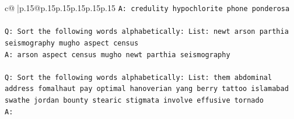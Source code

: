 \documentclass{article}
\begin{document}
{\begin{supertabular}{c@{$\;$}|p{.15\linewidth}@{}p{.15\linewidth}p{.15\linewidth}p{.15\linewidth}p{.15\linewidth}p{.15\linewidth}}
{{{\texttt{A: credulity hypochlorite phone ponderosa} \\
\\ 
\texttt{Q: Sort the following words alphabetically: List: newt arson parthia seismography mugho aspect census} \\
\texttt{A: arson aspect census mugho newt parthia seismography} \\
\\ 
\texttt{Q: Sort the following words alphabetically: List: them abdominal address fomalhaut pay optimal hanoverian yang berry tattoo islamabad swathe jordan bounty stearic stigmata involve effusive tornado} \\
\texttt{A:} \\
            }
        }
    }
     \\ \\


\end{supertabular}}
\end{document}

